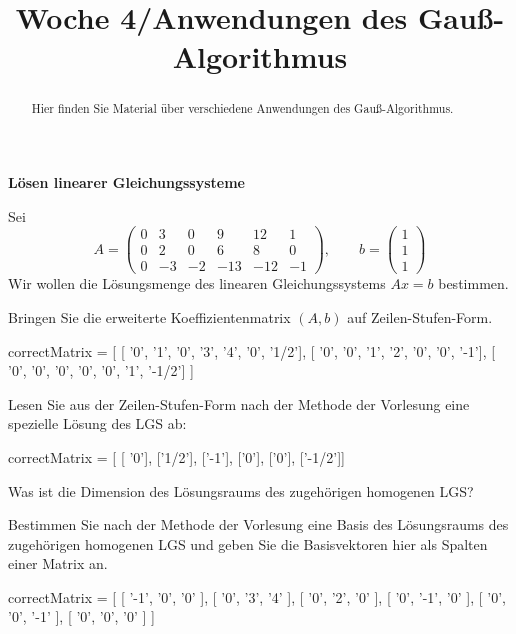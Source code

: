 \documentclass{ximera}
\title{Woche 4/Anwendungen des Gauß-Algorithmus}
\begin{document}
\begin{abstract}
Hier finden Sie Material über verschiedene Anwendungen des Gauß-Algorithmus.
\end{abstract}
\maketitle


\textbf{Lösen linearer Gleichungssysteme}

\begin{question}
Sei
\[
A = \left(
\begin{array}{cccccc}
  0&  3&  0&  9& 12&  1\\
  0&  2&  0&  6&  8&  0\\
  0& -3& -2&-13&-12& -1
\end{array}
\right),\qquad
b = \left(
\begin{array}{c}
1 \\ 1 \\ 1
\end{array}
\right)
\]
Wir wollen die Lösungsmenge des linearen Gleichungssystems $Ax=b$ bestimmen.

\begin{solution}
Bringen Sie die erweiterte Koeffizientenmatrix $(A, b)$ auf Zeilen-Stufen-Form.
\begin{matrix-answer}
correctMatrix = [
[   '0',    '1',    '0',    '3',    '4',    '0',  '1/2'],
[   '0',    '0',    '1',    '2',    '0',    '0',   '-1'],
[   '0',    '0',    '0',    '0',    '0',    '1', '-1/2'] ]
\end{matrix-answer}
\end{solution}

\begin{solution}
Lesen Sie aus der Zeilen-Stufen-Form nach der Methode der Vorlesung eine spezielle Lösung des LGS ab:
\begin{matrix-answer}
correctMatrix = [ [ '0'], ['1/2'], ['-1'], ['0'], ['0'], ['-1/2']]
\end{matrix-answer}
\end{solution}

\begin{solution}
Was ist die Dimension des Lösungsraums des zugehörigen homogenen LGS?
\end{solution}

\begin{solution}
Bestimmen Sie nach der Methode der Vorlesung eine Basis des Lösungsraums des zugehörigen homogenen LGS und geben Sie die Basisvektoren hier als Spalten einer Matrix an.
\begin{matrix-answer}
correctMatrix = [
[   '-1',    '0',    '0'  ],
[   '0',    '3',    '4'  ],
[   '0',    '2',    '0'  ],
[   '0',    '-1',    '0'  ],
[   '0',    '0',    '-1'  ],
[   '0',    '0',    '0'  ] ]
\end{matrix-answer}
\end{solution}
\end{question}
\end{document}
